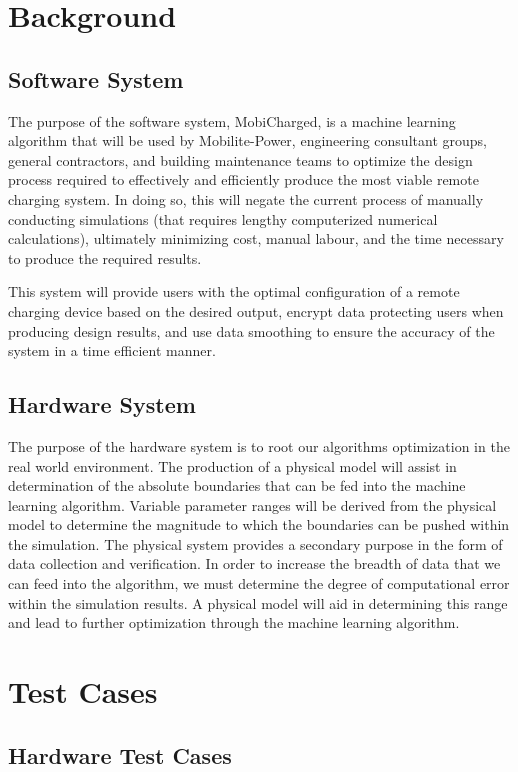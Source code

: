 \documentclass[12pt, titlepage]{article}
\begin{document}
\section{Background}
\subsection{Software System}
The purpose of the software system, MobiCharged, is a machine learning algorithm that will be used by Mobilite-Power, engineering consultant groups, general contractors, and building maintenance teams to optimize the design process required to effectively and efficiently produce the most viable remote charging system. In doing so, this will negate the current process of manually conducting simulations (that requires lengthy computerized numerical calculations), ultimately minimizing cost, manual labour, and the time necessary to produce the required results.
\par
This system will provide users with the optimal configuration of a remote charging device based on the desired output, encrypt data protecting users when producing design results, and use data smoothing to ensure the accuracy of the system in a time efficient manner.

\subsection{Hardware System}
The purpose of the hardware system is to root our algorithms optimization in the real world environment. The production of a physical model will assist in determination of the absolute boundaries that can be fed into the machine learning algorithm. Variable parameter ranges will be derived from the physical model to determine the magnitude to which the boundaries can be pushed within the simulation. The physical system provides a secondary purpose in the form of data collection and verification. In order to increase the breadth of data that we can feed into the algorithm, we must determine the degree of computational error within the simulation results. A physical model will aid in determining this range and lead to further optimization through the machine learning algorithm.

\section{Test Cases}
\subsection{Hardware Test Cases}
\end{document}
